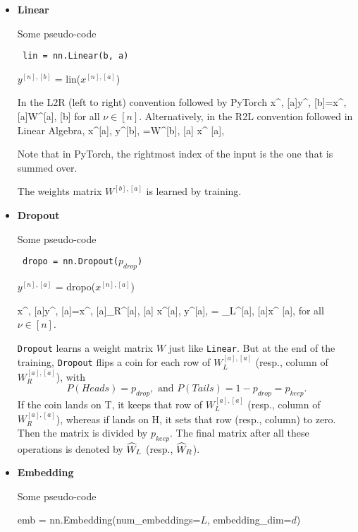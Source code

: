 \begin{itemize}
\item {\bf Linear}

Some pseudo-code
\begin{mdframed}[hidealllines=true,backgroundcolor=blue!10]
{\tt
lin = nn.Linear(b, a)

$y^{[n], [b]}$ = lin($x^{[n],[a]}$)
}
\end{mdframed}
In the L2R (left to right) convention followed by PyTorch
\beq
x^{\nu, [a]}\rarrow y^{\nu, [b]}=x^{\nu, [a]}W^{[a], [b]}
\eeq
for all  $\nu\in[n]$. Alternatively, in
the R2L convention followed in Linear Algebra,
\beq
x^{[a], \nu}\rarrow y^{[b], \nu}=W^{[b], [a]}
x^{ [a], \nu}
\eeq

Note that in PyTorch, the rightmost index of the input is the
one that is summed over.

The weights matrix $W^{[b], [a]}$ is learned by training.

\item {\bf Dropout}

Some pseudo-code
\begin{mdframed}[hidealllines=true,backgroundcolor=blue!10]
{\tt
dropo = nn.Dropout($p_{drop}$)

$y^{[n], [a]}$ = dropo($x^{[n],[a]}$)
}
\end{mdframed}


\beq
x^{\nu, [a]}\rarrow y^{\nu, [a]}=x^{\nu, [a]}_R^{[a], [a]}
\;\;
\eeq
\beq
x^{[a], \nu}\rarrow y^{[a], \nu}=
_L^{[a], [a]}x^{ [a],\nu}
\;\;
\eeq
for all  $\nu\in[n]$.

{\tt Dropout} learns a weight matrix $W$ just like
{\tt Linear}. But at the end of the
training,
{\tt  Dropout} flips a coin
for each row of $W_L^{[a], [a]}$ (resp., column of $W_R^{[a],
 [a]}$), with $$P(Heads)=p_{drop}, \text{ and } P(Tails)=1-p_{drop}=p_{keep}.$$If the coin lands on T, it keeps that row of $W_L^{[a], [a]}$ (resp., column of $W_R^{[a], [a]}$), whereas if lands on H,
it sets that row (resp., column) to zero. Then the
matrix  is
divided by $p_{keep}$.
The final matrix after all these operations  is denoted by ${\widehat{W}}_L$ (resp., ${\widehat{W}}_R$).



\item {\bf Embedding}

Some pseudo-code
\begin{mdframed}[hidealllines=true,backgroundcolor=blue!10]
{\tt

emb = nn.Embedding(num\_embeddings=$L$, embedding\_dim=$d$)

}
\end{mdframed}
\end{itemize}
